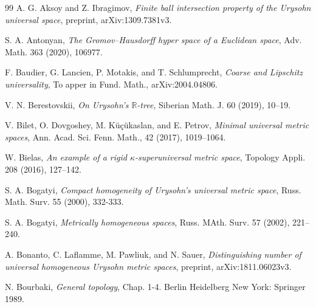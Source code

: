 \documentclass[leqno, 12pt]{jsarticle}
\newcommand{\rr}{\mathbb{R}}
\begin{document}


\newpage

\begin{thebibliography}{99}
A. G. Aksoy and Z. Ibragimov, 
\textit{Finite ball intersection property of the Urysohn universal space}, 
preprint, arXiv:1309.7381v3. 


S. A. Antonyan, 
\textit{The Gromov--Hausdorff hyper space of a Euclidean space}, 
Adv. Math. 363 (2020), 106977.


F. Baudier, G. Lancien, 
P. Motakis, 
and 
T. Schlumprecht, 
\textit{Coarse and Lipschitz universality}, 
To apper in Fund. Math., 
arXiv:2004.04806. 


V. N. Berestovskii, 
\textit{On Urysohn's $\rr$-tree}, 
Siberian Math. J. 60  (2019), 10--19. 

V. Bilet, 
O. Dovgoshey, 
M. K\"{u}\c{c}\"{u}kaslan, and 
E. Petrov, 
\textit{Minimal universal metric spaces}, 
Ann. Acad. Sci. Fenn. Math.,   42 (2017), 
1019--1064. 




W. Bielas, 
\textit{An example of a rigid $\kappa$-superuniversal metric space}, 
Topology Appli. 208 (2016), 127--142.  


S. A. Bogatyi, 
\textit{Compact homogeneity of 
Urysohn's universal metric space}, 
Russ. Math. Surv. 55 (2000), 332-333. 


S. A. Bogatyi, 
\textit{Metrically homogeneous spaces}, 
Russ. MAth. Surv. 57 (2002), 221--240. 


A. Bonanto, C. Laflamme, 
M. Pawliuk, 
and N. Sauer, 
\textit{Distinguishing number of universal homogeneous Urysohn metric spaces}, 
preprint, arXiv:1811.06023v3. 


N. Bourbaki, \textit{General topology}, 
Chap. 1-4. Berlin Heidelberg New York: Springer 1989. 


\end{thebibliography}
\end{document}
